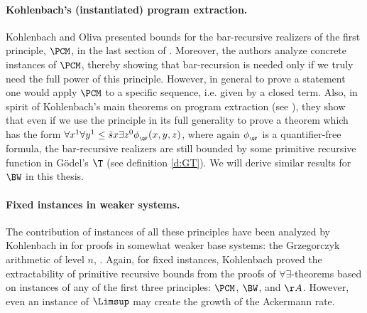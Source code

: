 \paragraph{Kohlenbach's (instantiated) program extraction.}
Kohlenbach and Oliva presented bounds for the bar-recursive realizers of the 
first principle, $\PCM$, in the last section of \cite{KO02}.
Moreover, the authors analyze concrete instances of $\PCM$, thereby showing that
bar-recursion is needed only if we truly need the full power of this principle. 
However, in general to prove a statement one would apply $\PCM$ to a specific
sequence, i.e. given by a closed term.
Also, in spirit of Kohlenbach's main theorems on program extraction 
(see \cite{Kohlenbach08}),  they show that even if we use the principle in its full generality
to prove a theorem which has the form 
$\forall x^1\forall y^1\leq\tilde sx\exists z^0 \phi_{_\QF}(x,y,z)$, 
where again $\phi_{_\QF}$ is a quantifier-free formula,
the bar-recursive realizers are still bounded by some primitive recursive
function in G\"odel's $\T$ (see definition \ref{d:GT}). We will derive
similar  results for $\BW$ in this thesis.
%
\paragraph{Fixed instances in weaker systems.}
The contribution of instances of all these principles 
have been analyzed by Kohlenbach in \cite{Kohlenbach98} for proofs in somewhat 
weaker base systems: the Grzegorczyk arithmetic of level $n$, . Again,
for fixed instances, Kohlenbach
proved the extractability of primitive recursive bounds from the proofs of
$\forall\exists$-theorems based on instances of
 any of the first three principles: $\PCM$, $\BW$, and $\AA$. However, 
even an instance of $\Limsup$ may create the growth of the Ackermann rate.
%

